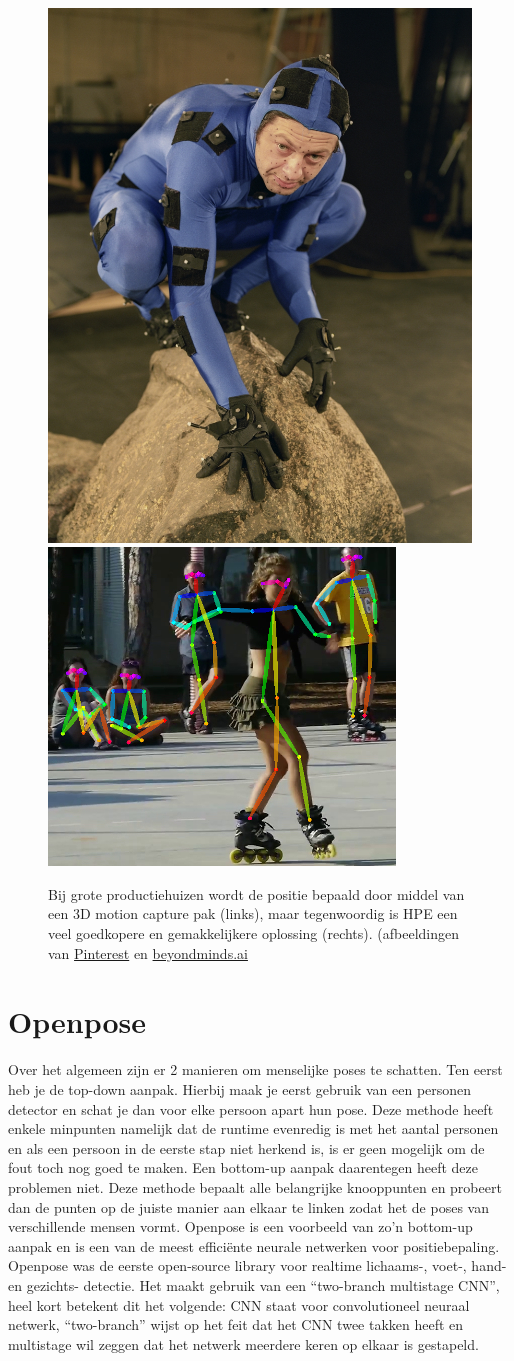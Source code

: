 \documentclass[a4paper,twoside,kulak]{kulakreport}
\begin{document}
	\begin{figure}[H]
		\includegraphics[width=.4\textwidth]{3D_motion_capture}
		\includegraphics[width=.55\textwidth]{HPE_voorbeeld}
		\caption{Bij grote productiehuizen wordt de positie bepaald door middel van een 3D motion capture pak (links), maar tegenwoordig is HPE een veel goedkopere en gemakkelijkere oplossing (rechts).
		(afbeeldingen van \href{https://www.pinterest.com/pin/718324209297102981/}{Pinterest} en \href{https://beyondminds.ai/an-overview-of-human-pose-estimation-with-deep-learning/}{beyondminds.ai}}
		\label{3D_pak}
	\end{figure}

\section{Openpose}

Over het algemeen zijn er 2 manieren om menselijke poses te schatten. Ten eerst heb je de top-down aanpak. Hierbij maak je eerst gebruik van een personen detector en schat je dan voor elke persoon apart hun pose.  Deze methode heeft enkele minpunten namelijk dat de runtime evenredig is met het aantal personen en als een persoon in de eerste stap niet herkend is, is er geen mogelijk om de fout toch nog goed te maken. Een bottom-up aanpak daarentegen heeft deze problemen niet. Deze methode bepaalt alle belangrijke knooppunten en probeert dan de punten op de juiste manier aan elkaar te linken zodat het de poses van verschillende mensen vormt. Openpose is een voorbeeld van zo’n bottom-up aanpak en is een van de meest efficiënte neurale netwerken voor positiebepaling. Openpose was de eerste open-source library voor realtime lichaams-, voet-, hand- en gezichts- detectie. Het maakt gebruik van een “two-branch multistage CNN”, heel kort betekent dit het volgende: CNN staat voor convolutioneel neuraal netwerk, “two-branch” wijst op het feit dat het CNN twee takken heeft en multistage wil zeggen dat het netwerk meerdere keren op elkaar is gestapeld.
\end{document}
